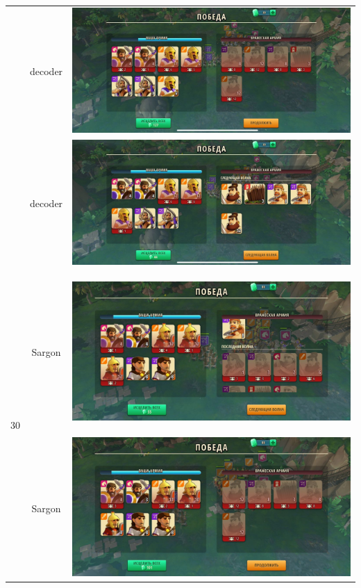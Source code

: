 \begin{longtable}{|c|c|c|}
    & decoder &
    \includegraphics[width=0.75\linewidth]{./parts/media/TreasureHunt/30/decoder/photo_2022-04-07_10-00-32.jpg} \\
    & decoder &
    \includegraphics[width=0.75\linewidth]{./parts/media/TreasureHunt/30/decoder/photo_2022-04-07_09-59-40.jpg} \\
    \hline
    \multirow{10}{*}{30} & Sargon &
    \hypertarget{fight30}{\includegraphics[width=0.75\linewidth]{./parts/media/TreasureHunt/30/sargon/photo_2022-04-07_10-05-00.jpg}} \\
    & Sargon &
    \includegraphics[width=0.75\linewidth]{./parts/media/TreasureHunt/30/sargon/photo_2022-04-07_10-05-04.jpg} \\

\end{longtable}
